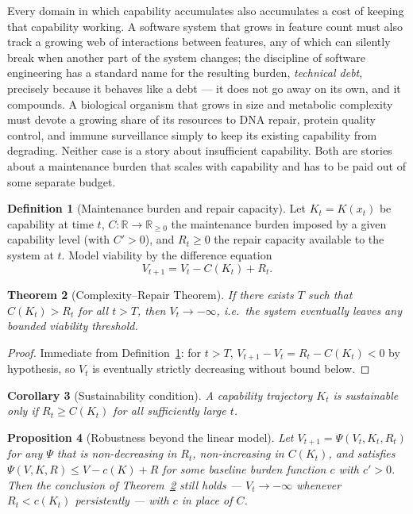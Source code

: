 \documentclass[12pt,a4paper]{article}
\theoremstyle{plain}
\newtheorem{theorem}{Theorem}[section]
\newtheorem{proposition}[theorem]{Proposition}
\newtheorem{corollary}[theorem]{Corollary}
\theoremstyle{definition}
\newtheorem{definition}[theorem]{Definition}
\theoremstyle{remark}
\begin{document}
Every domain in which capability accumulates also accumulates a cost of keeping that capability working. A software system that grows in feature count must also track a growing web of interactions between features, any of which can silently break when another part of the system changes; the discipline of software engineering has a standard name for the resulting burden, \emph{technical debt}, precisely because it behaves like a debt — it does not go away on its own, and it compounds. A biological organism that grows in size and metabolic complexity must devote a growing share of its resources to DNA repair, protein quality control, and immune surveillance simply to keep its existing capability from degrading. Neither case is a story about insufficient capability. Both are stories about a maintenance burden that scales with capability and has to be paid out of some separate budget.

\begin{definition}[Maintenance burden and repair capacity]
\label{def:maintenance-repair}
Let $K_t = K(x_t)$ be capability at time $t$, $C: \mathbb{R} \to \mathbb{R}_{\ge0}$ the maintenance burden imposed by a given capability level (with $C' > 0$), and $R_t \ge 0$ the repair capacity available to the system at $t$. Model viability by the difference equation
\[
V_{t+1} = V_t - C(K_t) + R_t.
\]
\end{definition}

\begin{theorem}[Complexity--Repair Theorem]
\label{thm:complexity-repair}
If there exists $T$ such that $C(K_t) > R_t$ for all $t > T$, then $V_t \to -\infty$, i.e.\ the system eventually leaves any bounded viability threshold.
\end{theorem}

\begin{proof}
Immediate from Definition~\ref{def:maintenance-repair}: for $t>T$, $V_{t+1}-V_t = R_t - C(K_t) < 0$ by hypothesis, so $V_t$ is eventually strictly decreasing without bound below.
\end{proof}

\begin{corollary}[Sustainability condition]
\label{cor:sustainability}
A capability trajectory $K_t$ is sustainable only if $R_t \ge C(K_t)$ for all sufficiently large $t$.
\end{corollary}

\begin{proposition}[Robustness beyond the linear model]
\label{prop:robustness-general}
Let $V_{t+1} = \Psi(V_t, K_t, R_t)$ for any $\Psi$ that is non-decreasing in $R_t$, non-increasing in $C(K_t)$, and satisfies $\Psi(V,K,R) \le V - c(K) + R$ for some baseline burden function $c$ with $c' > 0$. Then the conclusion of Theorem~\ref{thm:complexity-repair} still holds — $V_t \to -\infty$ whenever $R_t < c(K_t)$ persistently — with $c$ in place of $C$.
\end{proposition}
\end{document}

